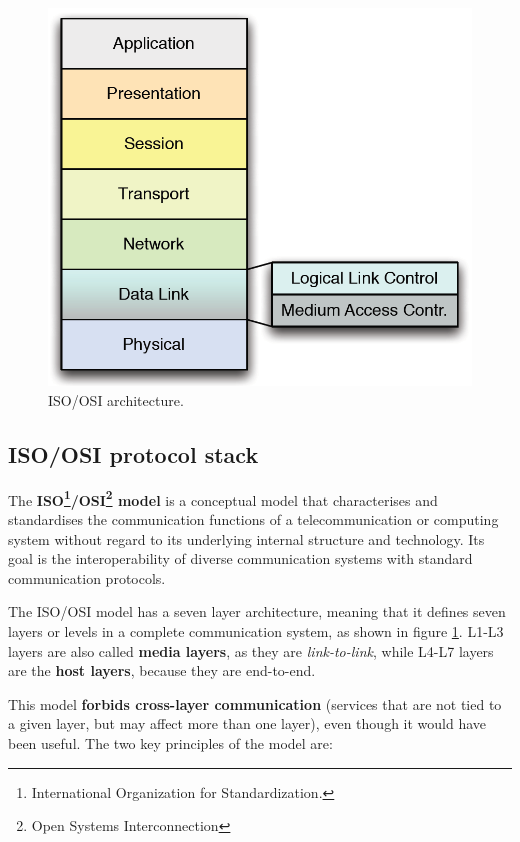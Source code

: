 \begin{figure}[H]
    \centering
    \includegraphics[scale=0.5]{img/isoosi.png}
    \decoRule
    \caption{ISO/OSI architecture.}
    \label{fig:isoosi}
\end{figure}


\subsection{ISO/OSI protocol stack}
\label{sec:iso_osi}
The \textbf{ISO\footnote{International Organization for Standardization.}/OSI\footnote{Open Systems Interconnection} model} is a conceptual model that characterises and standardises the communication functions of a telecommunication or computing system without regard to its underlying internal structure and technology. Its goal is the interoperability of diverse communication systems with standard communication protocols.

The ISO/OSI model has a seven layer architecture, meaning that it defines seven layers or levels in a complete communication system, as shown in figure \ref{fig:isoosi}. L1-L3 layers are also called \textbf{media layers}, as they are \textit{link-to-link}, while L4-L7 layers are the \textbf{host layers}, because they are end-to-end.

This model \textbf{forbids cross-layer communication} (services that are not tied to a given layer, but may affect more than one layer), even though it would have been useful. The two key principles of the model are:

